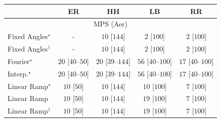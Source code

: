 \begin{tabular}{l|cccc|}
\toprule
            & ER & HH & LB & RR \\
\midrule
\multicolumn{5}{c}{\rule{0pt}{8pt}MPS (Aer)} \\
\midrule
Fixed Angles$^\star$ & {\cellcolor[HTML]{000000}} \color[HTML]{F1F1F1} {\cellcolor{white}} \color{black} - & {\cellcolor[HTML]{F6FCF4}} \color[HTML]{000000} $10$ [$144$] & {\cellcolor[HTML]{F7FCF5}} \color[HTML]{000000} $2$ [$100$] & {\cellcolor[HTML]{F7FCF5}} \color[HTML]{000000} $2$ [$100$] \\
Fixed Angles$^\dagger$ & {\cellcolor[HTML]{000000}} \color[HTML]{F1F1F1} {\cellcolor{white}} \color{black} - & {\cellcolor[HTML]{F6FCF4}} \color[HTML]{000000} $10$ [$144$] & {\cellcolor[HTML]{F7FCF5}} \color[HTML]{000000} $2$ [$100$] & {\cellcolor[HTML]{F7FCF5}} \color[HTML]{000000} $2$ [$100$] \\
Fourier$^\star$ & {\cellcolor[HTML]{F4FBF2}} \color[HTML]{000000} $20$ [$40$--$50$] & {\cellcolor[HTML]{F4FBF2}} \color[HTML]{000000} $20$ [$39$--$144$] & {\cellcolor[HTML]{EDF8EA}} \color[HTML]{000000} $56$ [$40$--$100$] & {\cellcolor[HTML]{F5FBF2}} \color[HTML]{000000} $17$ [$40$--$100$] \\
Interp.$^\star$ & {\cellcolor[HTML]{F4FBF2}} \color[HTML]{000000} $20$ [$40$--$50$] & {\cellcolor[HTML]{F4FBF2}} \color[HTML]{000000} $20$ [$39$--$144$] & {\cellcolor[HTML]{EDF8EA}} \color[HTML]{000000} $56$ [$40$--$100$] & {\cellcolor[HTML]{F5FBF2}} \color[HTML]{000000} $17$ [$40$--$100$] \\
Linear Ramp$^\star$ & {\cellcolor[HTML]{F6FCF4}} \color[HTML]{000000} $10$ [$50$] & {\cellcolor[HTML]{F6FCF4}} \color[HTML]{000000} $10$ [$144$] & {\cellcolor[HTML]{F6FCF4}} \color[HTML]{000000} $10$ [$100$] & {\cellcolor[HTML]{F6FCF4}} \color[HTML]{000000} $7$ [$100$] \\
Linear Ramp & {\cellcolor[HTML]{F6FCF4}} \color[HTML]{000000} $10$ [$50$] & {\cellcolor[HTML]{F6FCF4}} \color[HTML]{000000} $10$ [$144$] & {\cellcolor[HTML]{F4FBF2}} \color[HTML]{000000} $19$ [$100$] & {\cellcolor[HTML]{F6FCF4}} \color[HTML]{000000} $7$ [$100$] \\
Linear Ramp$^\dagger$ & {\cellcolor[HTML]{F6FCF4}} \color[HTML]{000000} $10$ [$50$] & {\cellcolor[HTML]{F6FCF4}} \color[HTML]{000000} $10$ [$144$] & {\cellcolor[HTML]{F4FBF2}} \color[HTML]{000000} $19$ [$100$] & {\cellcolor[HTML]{F6FCF4}} \color[HTML]{000000} $7$ [$100$] \\

\end{tabular}
